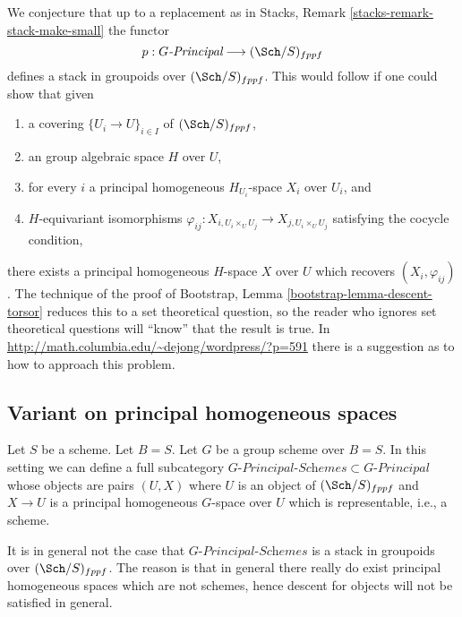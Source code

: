 \begin{remark}
\label{remark-principal-stack-in-groupoids}
We conjecture that up to a replacement as in
Stacks, Remark \ref{stacks-remark-stack-make-small}
the functor
$$
p : G\textit{-Principal} \longrightarrow (\Sch/S)_{fppf}
$$
defines a stack in groupoids over $(\Sch/S)_{fppf}$. This would
follow if one could show that given
\begin{enumerate}
\item a covering $\{U_i \to U\}_{i \in I}$ of $(\Sch/S)_{fppf}$,
\item an group algebraic space $H$ over $U$,
\item for every $i$ a principal homogeneous $H_{U_i}$-space $X_i$
over $U_i$, and
\item $H$-equivariant isomorphisms
$\varphi_{ij} : X_{i, U_i \times_U U_j} \to X_{j, U_i \times_U U_j}$
satisfying the cocycle condition,
\end{enumerate}
there exists a principal homogeneous $H$-space $X$ over $U$
which recovers $(X_i, \varphi_{ij})$. The technique of the proof of
Bootstrap, Lemma \ref{bootstrap-lemma-descent-torsor}
reduces this to a set theoretical question, so the reader who ignores
set theoretical questions will ``know'' that the result is true. In
\url{http://math.columbia.edu/~dejong/wordpress/?p=591}
there is a suggestion as to how to approach this problem.
\end{remark}



\subsection{Variant on principal homogeneous spaces}
\label{subsection-variant-principal-homogeneous-spaces}

\noindent
Let $S$ be a scheme. Let $B = S$.
Let $G$ be a group scheme over $B = S$.
In this setting we can define a full subcategory
$G\textit{-Principal-Schemes} \subset G\textit{-Principal}$
whose objects are pairs $(U, X)$ where $U$ is an object of
$(\Sch/S)_{fppf}$ and $X \to U$ is a principal homogeneous
$G$-space over $U$ which is representable, i.e., a scheme.

\medskip\noindent
It is in general not the case that $G\textit{-Principal-Schemes}$ is
a stack in groupoids over $(\Sch/S)_{fppf}$. The reason is
that in general there really do exist principal homogeneous spaces
which are not schemes, hence descent for objects will not be satisfied
in general.



